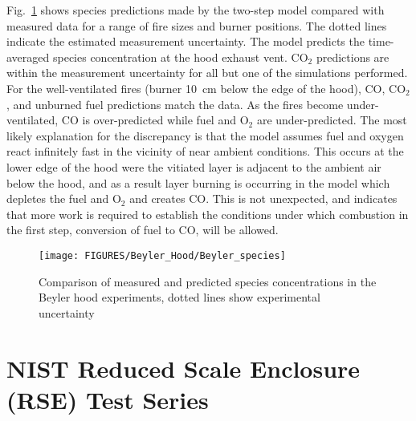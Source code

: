 Fig.~\ref{Beyler_Species} shows species predictions made by the two-step model compared with measured data for a
range of fire sizes and burner positions.  The dotted lines indicate the estimated measurement uncertainty.  The
model predicts the time-averaged species concentration at the hood exhaust vent.  CO$_2$ predictions are within the
measurement uncertainty for all but one of the simulations performed.  For the well-ventilated fires (burner 10~cm below the edge of the hood), CO,
CO$_2$, and unburned fuel predictions match the data.  As the fires become under-ventilated, CO is over-predicted while
fuel and O$_2$ are under-predicted.  The most likely explanation for the discrepancy is that the model assumes fuel and
oxygen react infinitely fast in the vicinity of near ambient conditions.  This occurs at the lower edge of the hood
were the vitiated layer is adjacent to the ambient air below the hood, and as a result layer burning is occurring in
the model which depletes the fuel and O$_2$ and creates CO.  This is not unexpected, and indicates that more work is
required to establish the conditions under which combustion in the first step, conversion of fuel to CO, will be
allowed.

\begin{figure}[p]
\texttt{[image: FIGURES/Beyler\_Hood/Beyler\_species]}
\caption{Comparison of measured and predicted species concentrations in the Beyler hood experiments,
dotted lines show experimental uncertainty }
\label{Beyler_Species}
\end{figure}

\clearpage

\section{NIST Reduced Scale Enclosure (RSE) Test Series}


